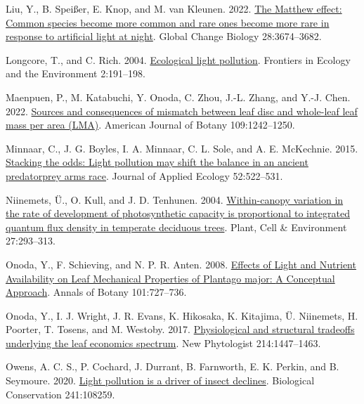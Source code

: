 \documentclass[
  12pt,
  letterpaper,
  DIV=11,
  numbers=noendperiod]{scrartcl}
\newlength{\cslhangindent}
\newlength{\cslentryspacingunit} %
\newenvironment{CSLReferences}[2] %
 {%
  \setlength{\parindent}{0pt}
  \ifodd #1
  \let\oldpar\par
  \def\par{\hangindent=\cslhangindent\oldpar}
  \fi
  \setlength{\parskip}{#2\cslentryspacingunit}
 }%
 {}
\begin{document}
\begin{CSLReferences}{1}{0}
\leavevmode{}%
Liu, Y., B. Speißer, E. Knop, and M. van Kleunen. 2022.
\href{https://doi.org/10.1111/gcb.16126}{The {Matthew} effect: {Common}
species become more common and rare ones become more rare in response to
artificial light at night}. Global Change Biology 28:3674--3682.

\leavevmode{}%
Longcore, T., and C. Rich. 2004.
\href{https://doi.org/10.1890/1540-9295(2004)002\%5B0191:ELP\%5D2.0.CO;2}{Ecological
light pollution}. Frontiers in Ecology and the Environment 2:191--198.

\leavevmode{}%
Maenpuen, P., M. Katabuchi, Y. Onoda, C. Zhou, J.-L. Zhang, and Y.-J.
Chen. 2022. \href{https://doi.org/10.1002/ajb2.16038}{Sources and
consequences of mismatch between leaf disc and whole-leaf leaf mass per
area ({LMA})}. American Journal of Botany 109:1242--1250.

\leavevmode{}%
Minnaar, C., J. G. Boyles, I. A. Minnaar, C. L. Sole, and A. E.
McKechnie. 2015. \href{https://doi.org/10.1111/1365-2664.12381}{Stacking
the odds: Light pollution may shift the balance in an ancient
predator\textendash prey arms race}. Journal of Applied Ecology
52:522--531.

\leavevmode{}%
Niinemets, Ü., O. Kull, and J. D. Tenhunen. 2004.
\href{https://doi.org/10.1111/j.1365-3040.2003.01143.x}{Within-canopy
variation in the rate of development of photosynthetic capacity is
proportional to integrated quantum flux density in temperate deciduous
trees}. Plant, Cell \& Environment 27:293--313.

\leavevmode{}%
Onoda, Y., F. Schieving, and N. P. R. Anten. 2008.
\href{https://doi.org/10.1093/aob/mcn013}{Effects of {Light} and
{Nutrient Availability} on {Leaf Mechanical Properties} of {Plantago}
major: {A Conceptual Approach}}. Annals of Botany 101:727--736.

\leavevmode{}%
Onoda, Y., I. J. Wright, J. R. Evans, K. Hikosaka, K. Kitajima, Ü.
Niinemets, H. Poorter, T. Tosens, and M. Westoby. 2017.
\href{https://doi.org/10.1111/nph.14496}{Physiological and structural
tradeoffs underlying the leaf economics spectrum}. New Phytologist
214:1447--1463.

\leavevmode{}%
Owens, A. C. S., P. Cochard, J. Durrant, B. Farnworth, E. K. Perkin, and
B. Seymoure. 2020.
\href{https://doi.org/10.1016/j.biocon.2019.108259}{Light pollution is a
driver of insect declines}. Biological Conservation 241:108259.


\end{CSLReferences}
\end{document}
